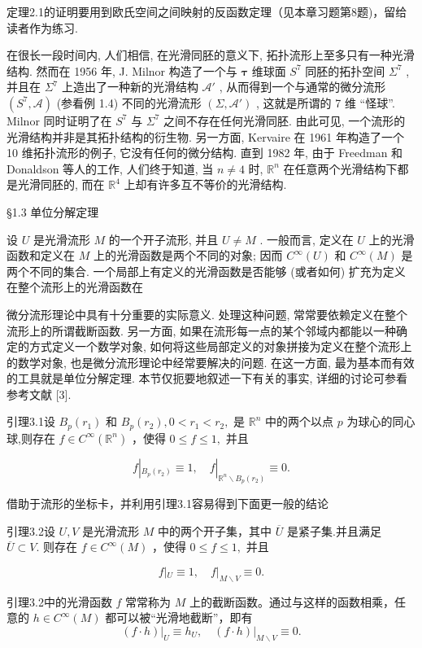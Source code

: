 定理2.1的证明要用到欧氏空间之间映射的反函数定理（见本章习题第8题)，留给读者作为练习.

在很长一段时间内, 人们相信, 在光滑同胚的意义下, 拓扑流形上至多只有一种光滑结构. 然而在 1956 年, J. Milnor 构造了一个与  $\pmb{\tau}$  维球面  $S^7$  同胚的拓扑空间  $\Sigma^7$ , 并且在  $\Sigma^7$  上造出了一种新的光滑结构  $\mathcal{A}'$ , 从而得到一个与通常的微分流形  $(S^7, \mathcal{A})$  (参看例 1.4) 不同的光滑流形  $(\Sigma, \mathcal{A}')$ , 这就是所谓的 7 维 “怪球”. Milnor 同时证明了在  $S^7$  与  $\Sigma^7$  之间不存在任何光滑同胚. 由此可见, 一个流形的光滑结构并非是其拓扑结构的衍生物. 另一方面, Kervaire 在 1961 年构造了一个 10 维拓扑流形的例子, 它没有任何的微分结构. 直到 1982 年, 由于 Freedman 和 Donaldson 等人的工作, 人们终于知道, 当  $n \neq 4$  时,  $\mathbb{R}^n$  在任意两个光滑结构下都是光滑同胚的, 而在  $\mathbb{R}^4$  上却有许多互不等价的光滑结构.

 §1.3 单位分解定理

设  $U$  是光滑流形  $M$  的一个开子流形, 并且  $U \neq M$ . 一般而言, 定义在  $U$  上的光滑函数和定义在  $M$  上的光滑函数是两个不同的对象; 因而  $C^\infty(U)$  和  $C^\infty(M)$  是两个不同的集合. 一个局部上有定义的光滑函数是否能够 (或者如何) 扩充为定义在整个流形上的光滑函数在

微分流形理论中具有十分重要的实际意义. 处理这种问题, 常常要依赖定义在整个流形上的所谓截断函数. 另一方面, 如果在流形每一点的某个邻域内都能以一种确定的方式定义一个数学对象, 如何将这些局部定义的对象拼接为定义在整个流形上的数学对象, 也是微分流形理论中经常要解决的问题. 在这一方面, 最为基本而有效的工具就是单位分解定理. 本节仅扼要地叙述一下有关的事实, 详细的讨论可参看参考文献 [3].

引理3.1设  $B_{p}(r_{1})$  和  $B_{p}(r_{2}),0 < r_{1} < r_{2},$  是  $\mathbb{R}^n$  中的两个以点 $p$  为球心的同心球,则存在  $f\in C^{\infty}(\mathbb{R}^{n})$  ，使得  $0\leqslant f\leqslant 1,$  并且

$$
f | _ {B _ {p} (r _ {2})} \equiv 1, \quad f | _ {\mathbb {R} ^ {n} \backslash B _ {p} (r _ {2})} \equiv 0.
$$

借助于流形的坐标卡，并利用引理3.1容易得到下面更一般的结论

引理3.2设  $U,V$  是光滑流形  $M$  中的两个开子集，其中  $\overline{U}$  是紧子集.并且满足  $\overline{U}\subset V.$  则存在  $f\in C^{\infty}(M)$  ，使得  $0\leqslant f\leqslant 1,$  并且

$$
f | _ {U} \equiv 1, \quad f | _ {M \backslash V} \equiv 0.
$$

引理3.2中的光滑函数  $f$  常常称为  $M$  上的截断函数。通过与这样的函数相乘，任意的  $h \in C^{\infty}(M)$  都可以被“光滑地截断”，即有
$$
\left. (f \cdot h) \right| _ {U} \equiv h _ {U}, \quad \left. (f \cdot h) \right| _ {M \backslash V} \equiv 0.
$$

